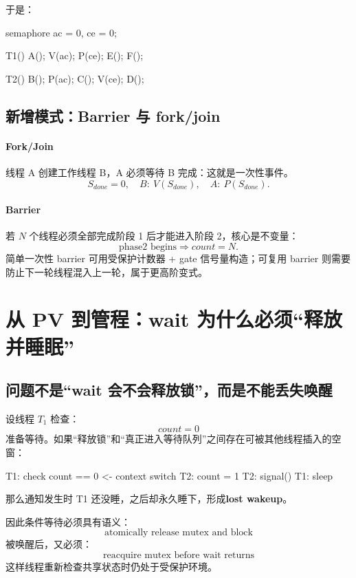 \documentclass[11pt,a4paper]{ctexart}
\newcommand{\kw}[1]{\textbf{#1}}
\begin{document}
于是：
\begin{codeblock}
semaphore ac = 0, ce = 0;

T1() {
    A();
    V(ac);
    P(ce);
    E();
    F();
}

T2() {
    B();
    P(ac);
    C();
    V(ce);
    D();
}
\end{codeblock}

\subsection{新增模式：Barrier 与 fork/join}

\paragraph{Fork/Join}
线程 A 创建工作线程 B，A 必须等待 B 完成：这就是一次性事件。
\[
S_{done}=0,\quad B:\ V(S_{done}),\quad A:\ P(S_{done}).
\]

\paragraph{Barrier}
若 $N$ 个线程必须全部完成阶段 1 后才能进入阶段 2，核心是不变量：
\[
\text{phase2 begins}\Rightarrow count=N.
\]
简单一次性 barrier 可用受保护计数器 + gate 信号量构造；可复用 barrier 则需要防止下一轮线程混入上一轮，属于更高阶变式。

\section{从 PV 到管程：wait 为什么必须“释放并睡眠”}

\subsection{问题不是“wait 会不会释放锁”，而是不能丢失唤醒}

设线程 $T_1$ 检查：
\[
count=0
\]
准备等待。如果“释放锁”和“真正进入等待队列”之间存在可被其他线程插入的空窗：

\begin{codeblock}
T1: check count == 0
                 <- context switch
T2: count = 1
T2: signal()
T1: sleep
\end{codeblock}

那么通知发生时 T1 还没睡，之后却永久睡下，形成\kw{lost wakeup}。

因此条件等待必须具有语义：
\[
\boxed{\text{atomically release mutex and block}}
\]
被唤醒后，又必须：
\[
\boxed{\text{reacquire mutex before wait returns}}
\]
这样线程重新检查共享状态时仍处于受保护环境。
\end{document}
